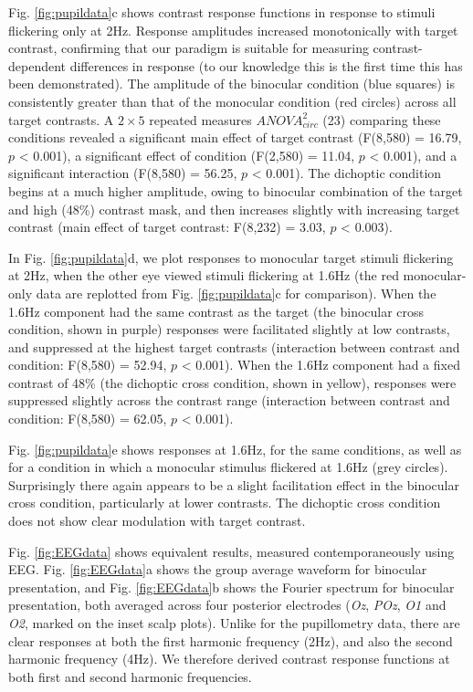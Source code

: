 \documentclass[
]{article}
\begin{document}
Fig. \ref{fig:pupildata}c shows contrast response functions in response to stimuli flickering only at 2Hz. Response amplitudes increased monotonically with target contrast, confirming that our paradigm is suitable for measuring contrast-dependent differences in response (to our knowledge this is the first time this has been demonstrated). The amplitude of the binocular condition (blue squares) is consistently greater than that of the monocular condition (red circles) across all target contrasts. A \(2\times5\) repeated measures \(ANOVA^2_{circ}\) (23) comparing these conditions revealed a significant main effect of target contrast (F(8,580) = 16.79, \(p\) \textless{} 0.001), a significant effect of condition (F(2,580) = 11.04, \(p\) \textless{} 0.001), and a significant interaction (F(8,580) = 56.25, \(p\) \textless{} 0.001). The dichoptic condition begins at a much higher amplitude, owing to binocular combination of the target and high (48\%) contrast mask, and then increases slightly with increasing target contrast (main effect of target contrast: F(8,232) = 3.03, \(p\) \textless{} 0.003).

In Fig. \ref{fig:pupildata}d, we plot responses to monocular target stimuli flickering at 2Hz, when the other eye viewed stimuli flickering at 1.6Hz (the red monocular-only data are replotted from Fig. \ref{fig:pupildata}c for comparison). When the 1.6Hz component had the same contrast as the target (the binocular cross condition, shown in purple) responses were facilitated slightly at low contrasts, and suppressed at the highest target contrasts (interaction between contrast and condition: F(8,580) = 52.94, \(p\) \textless{} 0.001). When the 1.6Hz component had a fixed contrast of 48\% (the dichoptic cross condition, shown in yellow), responses were suppressed slightly across the contrast range (interaction between contrast and condition: F(8,580) = 62.05, \(p\) \textless{} 0.001).

Fig. \ref{fig:pupildata}e shows responses at 1.6Hz, for the same conditions, as well as for a condition in which a monocular stimulus flickered at 1.6Hz (grey circles). Surprisingly there again appears to be a slight facilitation effect in the binocular cross condition, particularly at lower contrasts. The dichoptic cross condition does not show clear modulation with target contrast.

Fig. \ref{fig:EEGdata} shows equivalent results, measured contemporaneously using EEG. Fig. \ref{fig:EEGdata}a shows the group average waveform for binocular presentation, and Fig. \ref{fig:EEGdata}b shows the Fourier spectrum for binocular presentation, both averaged across four posterior electrodes (\emph{Oz}, \emph{POz}, \emph{O1} and \emph{O2}, marked on the inset scalp plots). Unlike for the pupillometry data, there are clear responses at both the first harmonic frequency (2Hz), and also the second harmonic frequency (4Hz). We therefore derived contrast response functions at both first and second harmonic frequencies.
\end{document}
